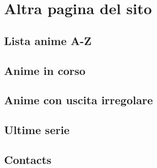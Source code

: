 \section{Altra pagina del sito}

\subsection{Lista anime A-Z}

\subsection{Anime in corso}

\subsection{Anime con uscita irregolare}

\subsection{Ultime serie}

\subsection{Contacts}
